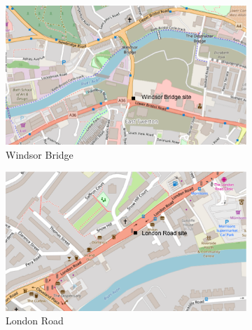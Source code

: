 \documentclass[11pt]{report}
\begin{document}
\begin{figure}[!tb]
    \centering
    \begin{minipage}{.9\linewidth}
            \begin{subfigure}[t]{.5\linewidth}
                \includegraphics[width=\textwidth]{images/windsor_bridge}
                \caption{Windsor Bridge}
                \label{fig: windsor_bridge}
            \end{subfigure} \hspace{5mm}
            \begin{subfigure}[t]{.5\linewidth}
            	\includegraphics[width=\textwidth]{images/london_road}
            	\caption{London Road}
            	\label{fig: london_road}
	   \end{subfigure}
        \end{minipage}
    \begin{minipage}{.9\linewidth}
        \vspace{4mm}
    	\centering
        \begin{subfigure}[t]{.5\linewidth}

\end{subfigure}
\end{minipage}
\end{figure}
\end{document}
